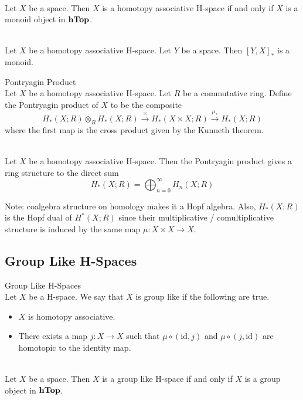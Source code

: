 \documentclass[a4paper]{article}
\begin{document}
\begin{lmm}{}{}\\
Let $X$ be a space. Then $X$ is a homotopy associative H-space if and only if $X$ is a monoid object in $\bold{hTop}$. 
\end{lmm}

\begin{lmm}{}{}\\
Let $X$ be a homotopy associative H-space. Let $Y$ be a space. Then $[Y,X]_\ast$ is a monoid. 
\end{lmm}

\begin{defn}{Pontryagin Product}{}\\
Let $X$ be a homotopy associative H-space. Let $R$ be a commutative ring. Define the Pontryagin product of $X$ to be the composite $$H_\ast(X;R)\otimes_RH_\ast(X;R)\overset{\times}{\to}H_\ast(X\times X;R)\overset{\mu_\ast}{\to}H_\ast(X;R)$$ where the first map is the cross product given by the Kunneth theorem. 
\end{defn}

\begin{prp}{}{}\\
Let $X$ be a homotopy associative H-space. Then the Pontryagin product gives a ring structure to the direct sum $$H_\ast(X;R)=\bigoplus_{n=0}^\infty H_n(X;R)$$
\end{prp}

Note: coalgebra structure on homology makes it a Hopf algebra. Also, $H_\ast(X;R)$ is the Hopf dual of $H^\ast(X;R)$ since their multiplicative / comultiplicative structure is induced by the same map $\mu:X\times X\to X$. 

\subsection{Group Like H-Spaces}
\begin{defn}{Group Like H-Spaces}{}\\
Let $X$ be a H-space. We say that $X$ is group like if the following are true. 
\begin{itemize}
\item $X$ is homotopy associative. 
\item There exists a map $j:X\to X$ such that $\mu\circ(\text{id},j)$ and $\mu\circ(j,\text{id})$ are homotopic to the identity map. 
\end{itemize}
\end{defn}

\begin{lmm}{}{}\\
Let $X$ be a space. Then $X$ is a group like H-space if and only if $X$ is a group object in $\bold{hTop}$. 
\end{lmm}
\end{document}
